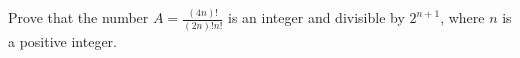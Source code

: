 Prove that the number $A=\frac{(4n)!}{(2n)!n!}$ is an integer and divisible by $2^{n+1}$,
where $n$ is a positive integer.